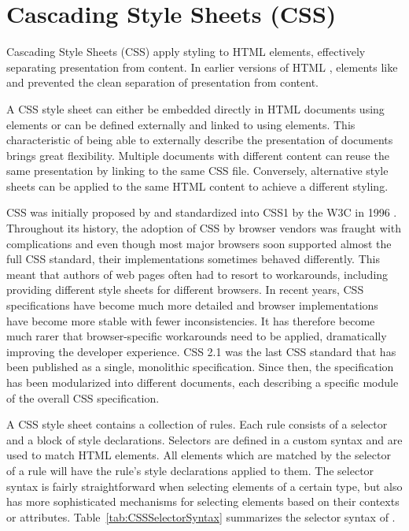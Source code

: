 \section{Cascading Style Sheets (CSS)}
\label{sec:CSS}

Cascading Style Sheets (CSS) apply styling to HTML elements,
effectively separating presentation from content. In earlier versions
of HTML \parencite{HTML32}, elements like  and
 prevented the clean separation of presentation from
content.

A CSS style sheet can either be embedded directly in HTML documents
using  elements or can be defined externally and
linked to using  elements. This characteristic of being
able to externally describe the presentation of documents brings great
flexibility. Multiple documents with different content can reuse the
same presentation by linking to the same CSS file. Conversely,
alternative style sheets can be applied to the same HTML content to
achieve a different styling.

CSS was initially proposed by \cite{CSSProposal} and standardized into
CSS1 by the W3C in 1996 \parencite{CSS1}. Throughout its history, the
adoption of CSS by browser vendors was fraught with complications and
even though most major browsers soon supported almost the full CSS
standard, their implementations sometimes behaved differently. This
meant that authors of web pages often had to resort to workarounds,
including providing different style sheets for different browsers. In
recent years, CSS specifications have become much more detailed
\parencite{CSS21} and browser implementations have become more stable
with fewer inconsistencies. It has therefore become much rarer that
browser-specific workarounds need to be applied, dramatically
improving the developer experience. CSS 2.1 \parencite{CSS21} was the last
CSS standard that has been published as a single, monolithic specification.
Since then, the specification has been modularized into different
documents, each describing a specific module of the overall CSS 
specification.
 

A CSS style sheet contains a collection of rules. Each rule consists
of a selector and a block of style declarations. Selectors are defined
in a custom syntax and are used to match HTML elements.  All elements
which are matched by the selector of a rule will have the rule's style
declarations applied to them. The selector syntax is fairly
straightforward when selecting elements of a certain type, but also
has more sophisticated mechanisms for selecting elements based on
their contexts or attributes. Table~\ref{tab:CSSSelectorSyntax}
summarizes the selector syntax of \textcite{CSSSelectors3}.

